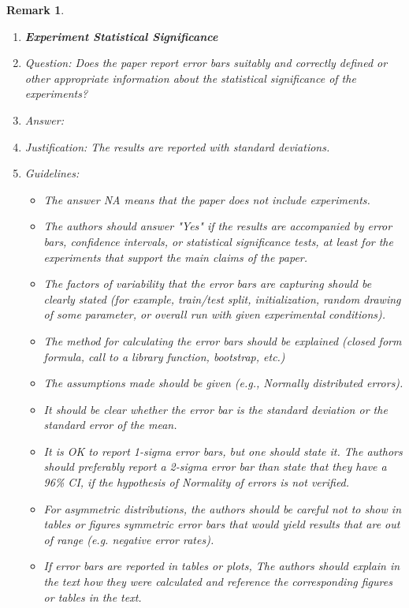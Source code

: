 \documentclass{article}
\newtheorem{remark}{Remark}
\begin{document}
\begin{remark}
\begin{enumerate}
\item {\bf Experiment Statistical Significance}
    \item[] Question: Does the paper report error bars suitably and correctly defined or other appropriate information about the statistical significance of the experiments?
    \item[] Answer: \answerYes{}
    \item[] Justification: The results are reported with standard deviations.
    \item[] Guidelines:
    \begin{itemize}
        \item The answer NA means that the paper does not include experiments.
        \item The authors should answer "Yes" if the results are accompanied by error bars, confidence intervals, or statistical significance tests, at least for the experiments that support the main claims of the paper.
        \item The factors of variability that the error bars are capturing should be clearly stated (for example, train/test split, initialization, random drawing of some parameter, or overall run with given experimental conditions).
        \item The method for calculating the error bars should be explained (closed form formula, call to a library function, bootstrap, etc.)
        \item The assumptions made should be given (e.g., Normally distributed errors).
        \item It should be clear whether the error bar is the standard deviation or the standard error of the mean.
        \item It is OK to report 1-sigma error bars, but one should state it. The authors should preferably report a 2-sigma error bar than state that they have a 96\% CI, if the hypothesis of Normality of errors is not verified.
        \item For asymmetric distributions, the authors should be careful not to show in tables or figures symmetric error bars that would yield results that are out of range (e.g. negative error rates).
        \item If error bars are reported in tables or plots, The authors should explain in the text how they were calculated and reference the corresponding figures or tables in the text.
    \end{itemize}


\end{enumerate}
\end{remark}
\end{document}
